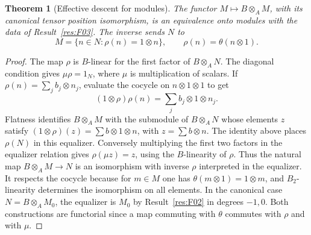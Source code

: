 \documentclass[11pt,oneside,openany]{book}
\newtheorem{theorem}{Theorem}[chapter]
\theoremstyle{definition}
\theoremstyle{remark}
\begin{document}
\begin{theorem}[Effective descent for modules]\label{res:F04}
The functor \(M\mapsto B\otimes_A M\), with its canonical tensor
position isomorphism, is an equivalence onto modules with the
data of Result~\ref{res:F03}. The inverse sends \(N\) to
\[
 M=\{n\in N:\rho(n)=1\otimes n\},\qquad
 \rho(n)=\theta(n\otimes1).
\]
\end{theorem}
\begin{proof}
The map \(\rho\) is \(B\)-linear for the first factor of \(B\otimes_A N\).
The diagonal condition gives \(\mu\rho=1_N\), where \(\mu\) is
multiplication of scalars. If \(\rho(n)=\sum_j b_j\otimes n_j\),
evaluate the cocycle on \(n\otimes1\otimes1\) to get
\[
 (1\otimes\rho)\rho(n)=\sum_j b_j\otimes1\otimes n_j .
\]
Flatness identifies \(B\otimes_A M\) with the submodule of
\(B\otimes_A N\) whose elements \(z\) satisfy
\((1\otimes\rho)(z)=\sum b\otimes1\otimes n\), with
\(z=\sum b\otimes n\). The identity above places \(\rho(N)\)
in this equalizer. Conversely multiplying the first two factors in
the equalizer relation gives \(\rho(\mu z)=z\), using the \(B\)-linearity
of \(\rho\). Thus the natural map \(B\otimes_A M\to N\) is an isomorphism
with inverse \(\rho\) interpreted in the equalizer.
It respects the cocycle because for \(m\in M\) one has
\(\theta(m\otimes1)=1\otimes m\), and \(B_2\)-linearity determines
the isomorphism on all elements. In the canonical case
\(N=B\otimes_A M_0\), the equalizer is \(M_0\) by
Result~\ref{res:F02} in degrees \(-1,0\).
Both constructions are functorial since a map commuting with
\(\theta\) commutes with \(\rho\) and with \(\mu\).
\end{proof}
\end{document}

